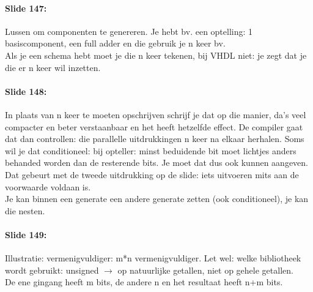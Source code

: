 \documentclass[10pt,a4paper]{book}
\begin{document}
\paragraph{Slide 147:} Lussen om componenten te genereren. Je hebt bv. een optelling: 1 basiscomponent, een full adder en die gebruik je n keer bv.\\
Als je een schema hebt moet je die n keer tekenen, bij VHDL niet: je zegt dat je die er n keer wil inzetten.

\paragraph{Slide 148:} In plaats van n keer te moeten opschrijven schrijf je dat op die manier, da's veel compacter en beter verstaanbaar en het heeft hetzelfde effect. De compiler gaat dat dan controllen: die parallelle uitdrukkingen n keer na elkaar herhalen. Soms wil je dat conditioneel: bij opteller: minst beduidende bit moet lichtjes anders behanded worden dan de resterende bits. Je moet dat dus ook kunnen aangeven. Dat gebeurt met de tweede uitdrukking op de slide: iets uitvoeren mits aan de voorwaarde voldaan is.\\
Je kan binnen een generate een andere generate zetten (ook conditioneel), je kan die nesten.

\paragraph{Slide 149:} Illustratie: vermenigvuldiger: m*n vermenigvuldiger. Let wel: welke bibliotheek wordt gebruikt: unsigned $\rightarrow$ op natuurlijke getallen, niet op gehele getallen.\\
De ene gingang heeft m bits, de andere n en het resultaat heeft n+m bits. 
\end{document}

